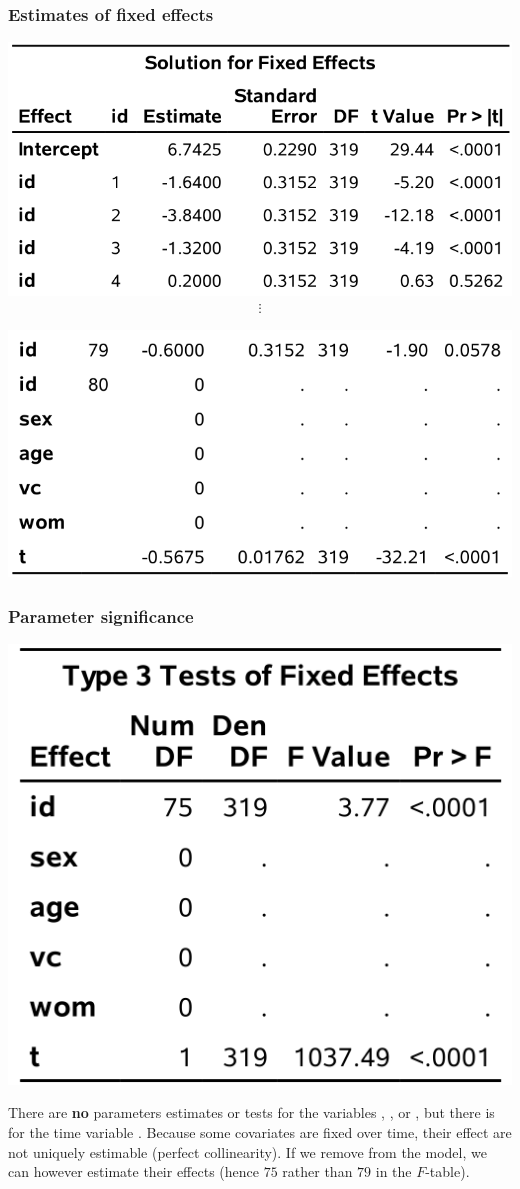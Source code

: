 \documentclass{beamer}
\begin{document}
 \begin{frame}
\frametitle{Estimates of fixed effects}
\begin{center}
\includegraphics[width = 0.6\linewidth]{img/c6/slides7-e01}
\begin{align*}
\vdots      \end{align*}



\includegraphics[width = 0.6\linewidth]{img/c6/slides7-e02}
\end{center}

\end{frame}


 \begin{frame}
\frametitle{Parameter significance}
\begin{center}
\includegraphics[width=0.4\linewidth]{img/c6/slides7-e03}
\end{center}
{\footnotesize 


There are \textbf{no} parameters estimates or tests for the variables , ,  or , but there is for the time variable . 
Because some covariates are fixed over time, their effect are not uniquely estimable (perfect collinearity). If we remove  from the model, we can however estimate their effects (hence $75$  rather than $79$ in the $F$-table).

}
\end{frame}
\end{document}
